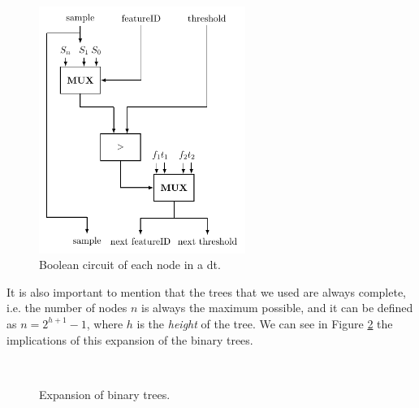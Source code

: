 \begin{figure}[ht]
  \centering
  \includegraphics[width=0.60\textwidth]{images/decision_tree_node.pdf}
  \caption{Boolean circuit of each node in a \acs{dt}.}
  \label{fig:DTNode}
\end{figure}


It is also important to mention that the trees that we used are always complete, i.e. the number of nodes $n$ is always the maximum possible, and it can be defined as $n=2^{h+1}-1$, where $h$ is the \textit{height} of the tree. We can see in Figure \ref{fig:ExpansionBinaryTrees} the implications of this expansion of the binary trees.

\begin{figure}[ht]
	\centering
	\mbox{
	}
	\caption{Expansion of binary trees.}
    \label{fig:ExpansionBinaryTrees}
\end{figure}


